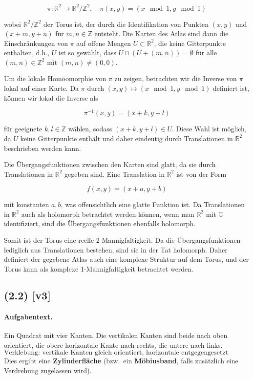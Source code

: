 \documentclass[11pt,a4paper]{article}
\begin{document}
\[
\pi: \mathbb{R}^2 \to \mathbb{R}^2 / \mathbb{Z}^2, \quad \pi(x,y) = (x \mod 1, y \mod 1)
\]

wobei \(\mathbb{R}^2 / \mathbb{Z}^2\) der Torus ist, der durch die Identifikation von Punkten \((x,y)\) und \((x+m, y+n)\) für \(m, n \in \mathbb{Z}\) entsteht. Die Karten des Atlas sind dann die Einschränkungen von \(\pi\) auf offene Mengen \(U \subset \mathbb{R}^2\), die keine Gitterpunkte enthalten, d.h., \(U\) ist so gewählt, dass \(U \cap (U + (m,n)) = \emptyset\) für alle \((m,n) \in \mathbb{Z}^2\) mit \((m,n) \neq (0,0)\).

Um die lokale Homöomorphie von \(\pi\) zu zeigen, betrachten wir die Inverse von \(\pi\) lokal auf einer Karte. Da \(\pi\) durch \((x,y) \mapsto (x \mod 1, y \mod 1)\) definiert ist, können wir lokal die Inverse als

\[
\pi^{-1}(x,y) = (x+k, y+l)
\]

für geeignete \(k, l \in \mathbb{Z}\) wählen, sodass \((x+k, y+l) \in U\). Diese Wahl ist möglich, da \(U\) keine Gitterpunkte enthält und daher eindeutig durch Translationen in \(\mathbb{R}^2\) beschrieben werden kann.

Die Übergangsfunktionen zwischen den Karten sind glatt, da sie durch Translationen in \(\mathbb{R}^2\) gegeben sind. Eine Translation in \(\mathbb{R}^2\) ist von der Form

\[
f(x,y) = (x+a, y+b)
\]

mit konstanten \(a, b\), was offensichtlich eine glatte Funktion ist. Da Translationen in \(\mathbb{R}^2\) auch als holomorph betrachtet werden können, wenn man \(\mathbb{R}^2\) mit \(\mathbb{C}\) identifiziert, sind die Übergangsfunktionen ebenfalls holomorph.

Somit ist der Torus eine reelle 2-Mannigfaltigkeit. Da die Übergangsfunktionen lediglich aus Translationen bestehen, sind sie in der Tat holomorph. Daher definiert der gegebene Atlas auch eine komplexe Struktur auf dem Torus, und der Torus kann als komplexe 1-Mannigfaltigkeit betrachtet werden.


\subsection*{(2.2) [v3]}
\paragraph{Aufgabentext.}
Ein Quadrat mit vier Kanten. 
Die vertikalen Kanten sind beide nach oben orientiert, 
die obere horizontale Kante nach rechts, 
die untere nach links.  
\[
\text{Verklebung: vertikale Kanten gleich orientiert, horizontale entgegengesetzt orientiert.}
\]
Dies ergibt eine \textbf{Zylinderfläche} 
(bzw.\ ein \textbf{Möbiusband}, falls zusätzlich eine Verdrehung zugelassen wird).
\end{document}
